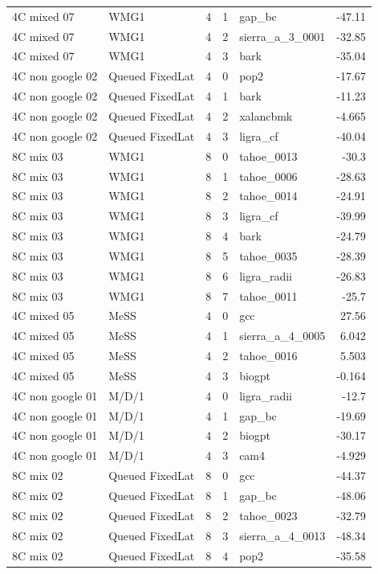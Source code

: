 \begin{tabular}{llrrlr}
4C mixed 07 & WMG1 & 4 & 1 & gap\_bc & -47.11 \\
4C mixed 07 & WMG1 & 4 & 2 & sierra\_a\_3\_0001 & -32.85 \\
4C mixed 07 & WMG1 & 4 & 3 & bark & -35.04 \\
4C non google 02 & Queued FixedLat & 4 & 0 & pop2 & -17.67 \\
4C non google 02 & Queued FixedLat & 4 & 1 & bark & -11.23 \\
4C non google 02 & Queued FixedLat & 4 & 2 & xalancbmk & -4.665 \\
4C non google 02 & Queued FixedLat & 4 & 3 & ligra\_cf & -40.04 \\
8C mix 03 & WMG1 & 8 & 0 & tahoe\_0013 & -30.3 \\
8C mix 03 & WMG1 & 8 & 1 & tahoe\_0006 & -28.63 \\
8C mix 03 & WMG1 & 8 & 2 & tahoe\_0014 & -24.91 \\
8C mix 03 & WMG1 & 8 & 3 & ligra\_cf & -39.99 \\
8C mix 03 & WMG1 & 8 & 4 & bark & -24.79 \\
8C mix 03 & WMG1 & 8 & 5 & tahoe\_0035 & -28.39 \\
8C mix 03 & WMG1 & 8 & 6 & ligra\_radii & -26.83 \\
8C mix 03 & WMG1 & 8 & 7 & tahoe\_0011 & -25.7 \\
4C mixed 05 & MeSS & 4 & 0 & gcc & 27.56 \\
4C mixed 05 & MeSS & 4 & 1 & sierra\_a\_4\_0005 & 6.042 \\
4C mixed 05 & MeSS & 4 & 2 & tahoe\_0016 & 5.503 \\
4C mixed 05 & MeSS & 4 & 3 & biogpt & -0.164 \\
4C non google 01 & M/D/1 & 4 & 0 & ligra\_radii & -12.7 \\
4C non google 01 & M/D/1 & 4 & 1 & gap\_bc & -19.69 \\
4C non google 01 & M/D/1 & 4 & 2 & biogpt & -30.17 \\
4C non google 01 & M/D/1 & 4 & 3 & cam4 & -4.929 \\
8C mix 02 & Queued FixedLat & 8 & 0 & gcc & -44.37 \\
8C mix 02 & Queued FixedLat & 8 & 1 & gap\_bc & -48.06 \\
8C mix 02 & Queued FixedLat & 8 & 2 & tahoe\_0023 & -32.79 \\
8C mix 02 & Queued FixedLat & 8 & 3 & sierra\_a\_4\_0013 & -48.34 \\
8C mix 02 & Queued FixedLat & 8 & 4 & pop2 & -35.58 \\

\end{tabular}

